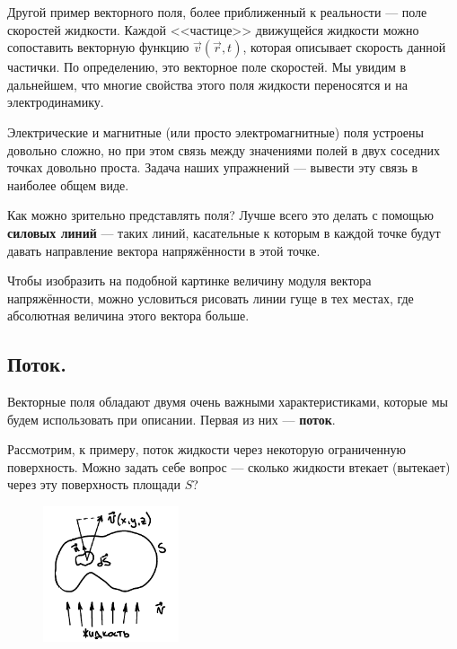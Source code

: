 \documentclass[a4paper,12pt]{article}
\numberwithin{equation}{section}
\begin{document}
Другой пример векторного поля, более приближенный к реальности ---
поле скоростей жидкости. Каждой <<частице>> движущейся жидкости можно
сопоставить векторную функцию $\vec{v}(\vec{r},t)$, которая описывает
скорость данной частички. По определению, это векторное поле
скоростей. Мы увидим в дальнейшем, что многие свойства этого поля
жидкости переносятся и на электродинамику. 

Электрические и магнитные (или просто электромагнитные) поля устроены
довольно сложно, но при этом связь между значениями полей в двух
соседних точках довольно проста. Задача наших упражнений --- вывести
эту связь в наиболее общем виде. 

\begin{figure}
  \vspace{-1cm}
  \begin{center}
  \end{center}
  \vspace{-1cm}
  \label{fig:force_lines}
\end{figure}

Как можно зрительно представлять поля? Лучше всего это делать с
помощью \textbf{силовых линий} --- таких линий, касательные к которым в
каждой точке будут давать направление вектора напряжённости в этой
точке. 

Чтобы изобразить на подобной картинке величину модуля вектора
напряжённости, можно условиться рисовать линии гуще в тех местах, где
абсолютная величина этого вектора больше. 

\subsection{Поток.}
\label{sec:flux}

Векторные поля обладают двумя очень важными характеристиками, которые
мы будем использовать при описании. Первая из них --- \textbf{поток}. 

Рассмотрим, к примеру, поток жидкости через некоторую ограниченную
поверхность. Можно задать себе вопрос --- сколько жидкости втекает
(вытекает) через эту поверхность площади $S$? 

\begin{figure}
  \begin{center}
    \includegraphics[width=4cm,height=4cm]{flux.pdf}
  \end{center}
  \label{fig:flux}
\end{figure}
\end{document}
